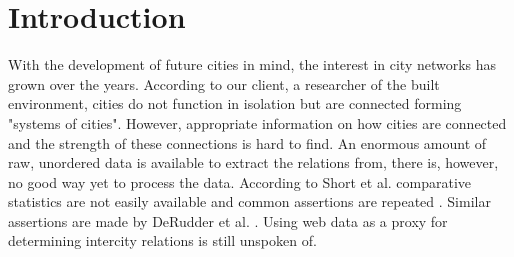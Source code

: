 \chapter{Introduction}
With the development of future cities in mind, the interest in city networks has grown over the years. According to our client, a researcher of the built environment, cities do not function in isolation but are connected forming "systems of cities". However, appropriate information on how cities are connected and the strength of these connections is hard to find. An enormous amount of raw, unordered data is available to extract the relations from, there is, however, no good way yet to process the data. According to Short et al. comparative statistics are not easily available and common assertions are repeated \cite{short1996dirty}. Similar assertions are made by DeRudder et al. \cite{derudder2005appraisal}. Using web data as a proxy for determining intercity relations is still unspoken of.

